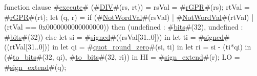 function clause #\hyperref[zexecute]{execute}# (#\hyperref[zDIV]{DIV}#(rs, rt)) =
  {
    rsVal = #\hyperref[zrGPR]{rGPR}#(rs);
    rtVal = #\hyperref[zrGPR]{rGPR}#(rt);
    let (q, r) =
      if (#\hyperref[zNotWordVal]{NotWordVal}#(rsVal) | #\hyperref[zNotWordVal]{NotWordVal}#(rtVal) | (rtVal == 0x0000000000000000)) then
	(undefined : #\hyperref[zbits]{bits}#(32), undefined : #\hyperref[zbits]{bits}#(32))
      else
        let si = #\hyperref[zsigned]{signed}#((rsVal[31..0])) in
        let ti = #\hyperref[zsigned]{signed}#((rtVal[31..0])) in
        let qi = #\hyperref[zquotzyroundzyzzero]{quot\_round\_zero}#(si, ti) in
        let ri = si - (ti*qi) in
	(#\hyperref[ztozybits]{to\_bits}#(32, qi), #\hyperref[ztozybits]{to\_bits}#(32, ri))
    in
    {
      HI = #\hyperref[zsignzyextend]{sign\_extend}#(r);
      LO = #\hyperref[zsignzyextend]{sign\_extend}#(q);
    }
  }
